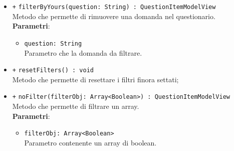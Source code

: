 \begin{itemize}
\begin{itemize}
		\item \texttt{+} \texttt{filterByYours(question: String) : QuestionItemModelView} \\
		Metodo che permette di rimuovere una domanda nel questionario.\\
		\textbf{Parametri}:
		\begin{itemize}
			\item \texttt{question: String}\\ Parametro che la domanda da filtrare.
		\end{itemize}
		\item \texttt{+} \texttt{resetFilters() : void} \\
		Metodo che permette di resettare i filtri finora settati;\\
		\item \texttt{+} \texttt{noFilter(filterObj: Array<Boolean>) : QuestionItemModelView} \\
		Metodo che permette di filtrare un array.\\
		\textbf{Parametri}:
		\begin{itemize}
			\item \texttt{filterObj: Array<Boolean>}\\ Parametro contenente un array di boolean.
		\end{itemize}
	\end{itemize}
\end{itemize}

